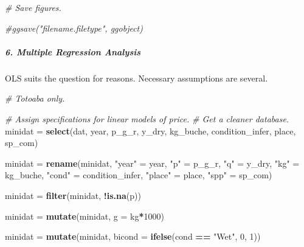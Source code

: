 \documentclass[]{article}
\newenvironment{Shaded}{\begin{snugshade}}{\end{snugshade}}
\newcommand{\KeywordTok}[1]{\textcolor[rgb]{0.13,0.29,0.53}{\textbf{#1}}}
\newcommand{\DataTypeTok}[1]{\textcolor[rgb]{0.13,0.29,0.53}{#1}}
\newcommand{\DecValTok}[1]{\textcolor[rgb]{0.00,0.00,0.81}{#1}}
\newcommand{\StringTok}[1]{\textcolor[rgb]{0.31,0.60,0.02}{#1}}
\newcommand{\CommentTok}[1]{\textcolor[rgb]{0.56,0.35,0.01}{\textit{#1}}}
\newcommand{\OperatorTok}[1]{\textcolor[rgb]{0.81,0.36,0.00}{\textbf{#1}}}
\newcommand{\NormalTok}[1]{#1}
\let\oldsubparagraph\subparagraph
\renewcommand{\subparagraph}[1]{\oldsubparagraph{#1}\mbox{}}
\begin{document}
\begin{Shaded}
\begin{Highlighting}[]
\CommentTok{# Save figures.}

\CommentTok{#ggsave("filename.filetype", ggobject)}
\end{Highlighting}
\end{Shaded}

\subparagraph{6. Multiple Regression
Analysis}\label{multiple-regression-analysis}

OLS suits the question for reasons. Necessary assumptions are several.

\begin{Shaded}
\begin{Highlighting}[]
\CommentTok{# Totoaba only.}

\CommentTok{# Assign specifications for linear models of price.}
\CommentTok{#  Get a cleaner database.}
\NormalTok{    minidat =}\StringTok{ }\KeywordTok{select}\NormalTok{(dat, }
\NormalTok{                     year, }
\NormalTok{                     p_g_r,}
\NormalTok{                     y_dry,}
\NormalTok{                     kg_buche, }
\NormalTok{                     condition_infer, }
\NormalTok{                     place, }
\NormalTok{                     sp_com)}
    
\NormalTok{    minidat =}\StringTok{ }\KeywordTok{rename}\NormalTok{(minidat,}
                    \StringTok{"year"}\NormalTok{ =}\StringTok{ }\NormalTok{year,}
                    \StringTok{"p"}\NormalTok{ =}\StringTok{ }\NormalTok{p_g_r,}
                    \StringTok{"q"}\NormalTok{ =}\StringTok{ }\NormalTok{y_dry,}
                    \StringTok{"kg"}\NormalTok{ =}\StringTok{ }\NormalTok{kg_buche,}
                    \StringTok{"cond"}\NormalTok{ =}\StringTok{ }\NormalTok{condition_infer,}
                    \StringTok{"place"}\NormalTok{ =}\StringTok{ }\NormalTok{place,}
                    \StringTok{"spp"}\NormalTok{ =}\StringTok{ }\NormalTok{sp_com)}
    
\NormalTok{    minidat =}\StringTok{ }\KeywordTok{filter}\NormalTok{(minidat, }\OperatorTok{!}\KeywordTok{is.na}\NormalTok{(p))}

\NormalTok{    minidat =}\StringTok{ }\KeywordTok{mutate}\NormalTok{(minidat, }\DataTypeTok{g =}\NormalTok{ kg}\OperatorTok{*}\DecValTok{1000}\NormalTok{)}
    
\NormalTok{    minidat =}\StringTok{ }\KeywordTok{mutate}\NormalTok{(minidat, }\DataTypeTok{bicond =} \KeywordTok{ifelse}\NormalTok{(cond }\OperatorTok{==}\StringTok{ "Wet"}\NormalTok{, }\DecValTok{0}\NormalTok{, }\DecValTok{1}\NormalTok{))}
    

\end{Highlighting}
\end{Shaded}
\end{document}
